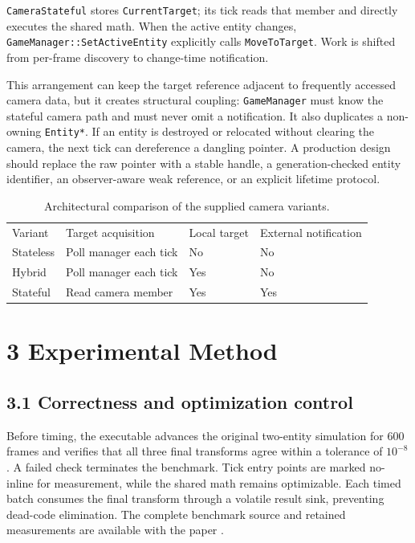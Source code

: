 \texttt{CameraStateful} stores \texttt{CurrentTarget}; its tick reads that member and directly executes the shared math. When the active entity changes, \texttt{GameManager::SetActiveEntity} explicitly calls \texttt{MoveToTarget}. Work is shifted from per-frame discovery to change-time notification.

This arrangement can keep the target reference adjacent to frequently accessed camera data, but it creates structural coupling: \texttt{GameManager} must know the stateful camera path and must never omit a notification. It also duplicates a non-owning \texttt{Entity*}. If an entity is destroyed or relocated without clearing the camera, the next tick can dereference a dangling pointer. A production design should replace the raw pointer with a stable handle, a generation-checked entity identifier, an observer-aware weak reference, or an explicit lifetime protocol.

\begin{table}
\caption{Architectural comparison of the supplied camera variants.}
\begin{tabular}{llll}
Variant & Target acquisition & Local target & External notification \\
Stateless & Poll manager each tick & No & No \\
Hybrid & Poll manager each tick & Yes & No \\
Stateful & Read camera member & Yes & Yes \\
\end{tabular}
\end{table}

\section{3 Experimental Method}

\subsection{3.1 Correctness and optimization control}

Before timing, the executable advances the original two-entity simulation for 600 frames and verifies that all three final transforms agree within a tolerance of \(10^{-8}\). A failed check terminates the benchmark. Tick entry points are marked no-inline for measurement, while the shared math remains optimizable. Each timed batch consumes the final transform through a volatile result sink, preventing dead-code elimination. The complete benchmark source and retained measurements are available with the paper \cite{sourceartifact,resultsartifact}.


